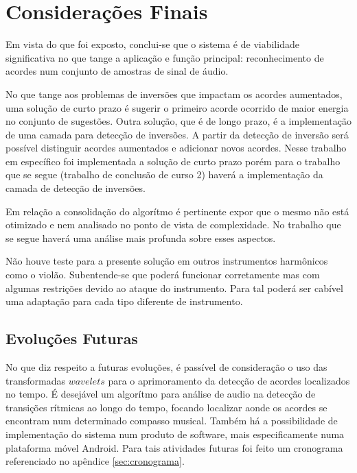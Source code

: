 \chapter{Considerações Finais}
\label{chap:conclusoes}

Em vista do que foi exposto, conclui-se que o sistema é de viabilidade significativa no que tange a aplicação e função principal: reconhecimento de acordes num conjunto de amostras de sinal de áudio.

No que tange aos problemas de inversões que impactam os acordes aumentados, uma solução de curto prazo é sugerir o primeiro acorde ocorrido de maior energia no conjunto de sugestões. Outra solução, que é de longo prazo, é a implementação de uma camada para detecção de inversões. A partir da detecção de inversão será possível distinguir acordes aumentados e adicionar novos acordes. Nesse trabalho em específico foi implementada a solução de curto prazo porém para o trabalho que se segue (trabalho de conclusão de curso 2) haverá a implementação da camada de detecção de inversões.

Em relação a consolidação do algorítmo é pertinente expor que o mesmo não está otimizado e nem analisado no ponto de vista de complexidade. No trabalho que se segue haverá uma análise mais profunda sobre esses aspectos.

Não houve teste para a presente solução em outros instrumentos harmônicos como o violão. Subentende-se que poderá funcionar corretamente mas com algumas restrições devido ao ataque do instrumento. Para tal poderá ser cabível uma adaptação para cada tipo diferente de instrumento.

\section{Evoluções Futuras}
\label{sec:precondicoes}

No que diz respeito a futuras evoluções, é passível de consideração o uso das transformadas $wavelets$ para o aprimoramento da detecção de acordes localizados no tempo. É desejável um algorítmo para análise de audio na detecção de transições rítmicas ao longo do tempo, focando localizar aonde os acordes se encontram num determinado compasso musical. Também há a possibilidade de implementação do sistema num produto de software, mais especificamente numa plataforma móvel Android. Para tais atividades futuras foi feito um cronograma referenciado no apêndice \ref{sec:cronograma}.
